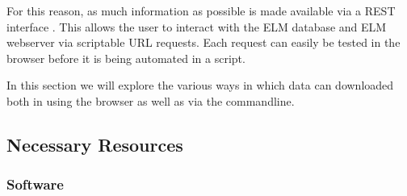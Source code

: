 \documentclass[12pt]{article}
\begin{document}
For this reason, as much information as possible is made available via a
REST interface \citep{Fielding2002}. This allows the user to interact
with the ELM database and ELM webserver via scriptable URL requests.
Each request can easily be tested in the browser before it is being
automated in a script.

In this section we will explore the various ways in which data can
downloaded both in using the browser as well as via the commandline.

%
%
\subsection*{Necessary Resources}
\subsubsection*{Software}

\end{document}
